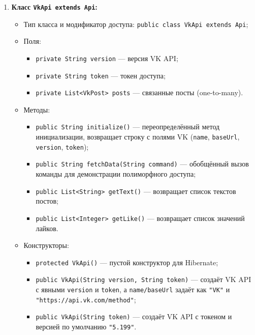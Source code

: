 \documentclass[11pt,a4paper]{article}
\begin{document}
\begin{enumerate}
    \item \textbf{Класс \texttt{VkApi extends Api}:}
    \begin{itemize}
        \item Тип класса и модификатор доступа: \texttt{public class VkApi extends Api};
        \item Поля:
        \begin{itemize}
            \item \texttt{private String version} --- версия VK API;
            \item \texttt{private String token} --- токен доступа;
            \item \texttt{private List<VkPost> posts} --- связанные посты (one-to-many).
        \end{itemize}
        \item Методы:
        \begin{itemize}
            \item \texttt{public String initialize()} --- переопределённый метод инициализации, возвращает строку с полями VK (\texttt{name}, \texttt{baseUrl}, \texttt{version}, \texttt{token});
            \item \texttt{public String fetchData(String command)} --- обобщённый вызов команды для демонстрации полиморфного доступа;
            \item \texttt{public List<String> getText()} --- возвращает список текстов постов;
            \item \texttt{public List<Integer> getLike()} --- возвращает список значений лайков.
        \end{itemize}
        \item Конструкторы:
        \begin{itemize}
            \item \texttt{protected VkApi()} --- пустой конструктор для Hibernate;
            \item \texttt{public VkApi(String version, String token)} --- создаёт VK API с явными \texttt{version} и \texttt{token}, а \texttt{name/baseUrl} задаёт как \texttt{"VK"} и \texttt{"https://api.vk.com/method"};
            \item \texttt{public VkApi(String token)} --- создаёт VK API с токеном и версией по умолчанию \texttt{"5.199"}.
        \end{itemize}
    \end{itemize}


\end{enumerate}
\end{document}
